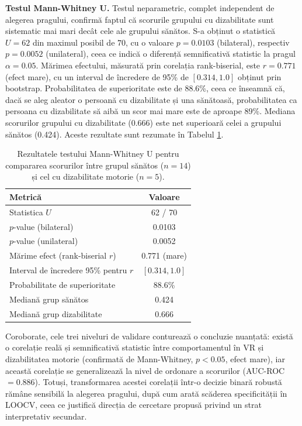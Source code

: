 \documentclass[12pt,a4paper]{report}
\theoremstyle{definition}
\theoremstyle{remark}
\begin{document}
\textbf{Testul Mann-Whitney U.} Testul neparametric, complet independent de alegerea pragului, confirmă faptul că scorurile grupului cu dizabilitate sunt sistematic mai mari decât cele ale grupului sănătos. S-a obținut o statistică $U = 62$ din maximul posibil de $70$, cu o valoare $p = 0.0103$ (bilateral), respectiv $p = 0.0052$ (unilateral), ceea ce indică o diferență semnificativă statistic la pragul $\alpha = 0.05$. Mărimea efectului, măsurată prin corelația rank-biserial, este $r = 0.771$ (efect mare), cu un interval de încredere de 95\% de $[0.314, 1.0]$ obținut prin bootstrap. Probabilitatea de superioritate este de 88.6\%, ceea ce înseamnă că, dacă se aleg aleator o persoană cu dizabilitate și una sănătoasă, probabilitatea ca persoana cu dizabilitate să aibă un scor mai mare este de aproape 89\%. Mediana scorurilor grupului cu dizabilitate (0.666) este net superioară celei a grupului sănătos (0.424). Aceste rezultate sunt rezumate în Tabelul \ref{tab:mannwhitney}.

\begin{table}[H]
\centering
\caption{Rezultatele testului Mann-Whitney U pentru compararea scorurilor între grupul sănătos ($n=14$) și cel cu dizabilitate motorie ($n=5$).}
\label{tab:mannwhitney}
\begin{tabular}{|l|c|}
\hline
\textbf{Metrică} & \textbf{Valoare} \\
\hline
Statistica $U$ & 62 / 70 \\
$p$-value (bilateral) & 0.0103 \\
$p$-value (unilateral) & 0.0052 \\
Mărime efect (rank-biserial $r$) & 0.771 (mare) \\
Interval de încredere 95\% pentru $r$ & $[0.314, 1.0]$ \\
Probabilitate de superioritate & 88.6\% \\
Mediană grup sănătos & 0.424 \\
Mediană grup dizabilitate & 0.666 \\
\hline
\end{tabular}
\end{table}

Coroborate, cele trei niveluri de validare conturează o concluzie nuanțată: există o corelație reală și semnificativă statistic între comportamentul în VR și dizabilitatea motorie (confirmată de Mann-Whitney, $p < 0.05$, efect mare), iar această corelație se generalizează la nivel de ordonare a scorurilor (AUC-ROC $= 0.886$). Totuși, transformarea acestei corelații într-o decizie binară robustă rămâne sensibilă la alegerea pragului, după cum arată scăderea specificității în LOOCV, ceea ce justifică direcția de cercetare propusă privind un strat interpretativ secundar.
\end{document}
